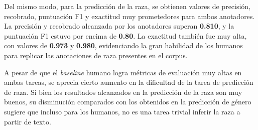 Del mismo modo, para la predicci\'on de la raza, se obtienen valores de precisi\'on, recobrado,
puntuaci\'on F1 y exactitud muy prometedores para ambos anotadores. La precisi\'on y 
recobrado alcanzada por los anotadores superan \textbf{0.810}, y la puntuaci\'on F1 estuvo 
por encima de \textbf{0.80}. La exactitud tambi\'en fue muy alta, con valores de \textbf{0.973}
y \textbf{0.980}, evidenciando la gran habilidad de los humanos para replicar las anotaciones
de raza presentes en el corpus.

A pesar de que el \emph{baseline} humano logra m\'etricas de evaluaci\'on muy altas en ambas 
tareas, se aprecia cierto aumento en la dificultad de la tarea de predicci\'on de raza. Si bien 
los resultados alcanzados en la predicci\'on de la raza son muy buenos, su disminuci\'on 
comparados con los obtenidos en la predicci\'on de g\'enero sugiere que incluso para los humanos, 
no es una tarea trivial inferir la raza a partir de texto.

